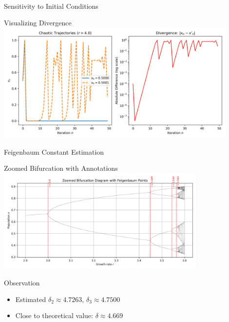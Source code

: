 \documentclass{beamer}
\begin{document}
\begin{frame}{Sensitivity to Initial Conditions}
  \begin{block}{Visualizing Divergence}
    \includegraphics[width=0.9\textwidth]{../Backend/Data/sensitivity_placeholder.png}
  \end{block}
\end{frame}

\begin{frame}{Feigenbaum Constant Estimation}
  \begin{block}{Zoomed Bifurcation with Annotations}
    \centering
    \includegraphics[width=0.78\textwidth]{../Backend/Data/feigenbaum_zoomed_labeled.png}
  \end{block}

  \vspace{-0.5em} %

  \begin{block}{Observation}
    \begin{itemize}
      \item Estimated $\delta_2 \approx 4.7263$, $\delta_3 \approx 4.7500$
      \item Close to theoretical value: $\delta \approx 4.669$
    \end{itemize}
  \end{block}
\end{frame}
\end{document}
